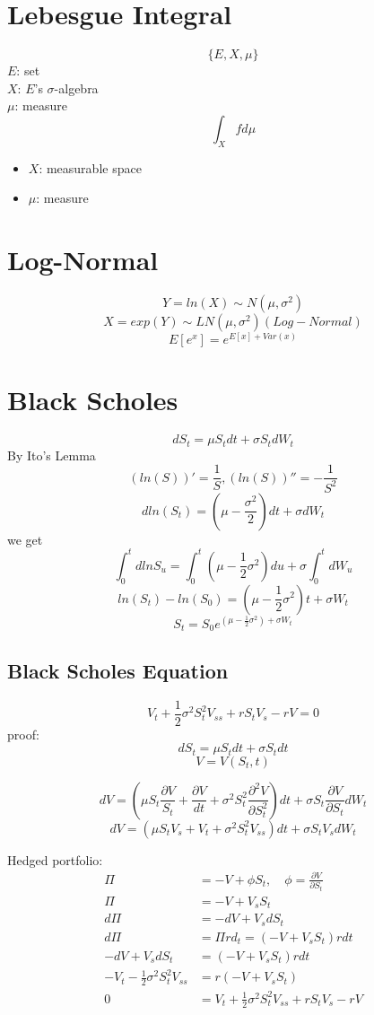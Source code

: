 \documentclass[12pt]{article}
\begin{document}
\section{Lebesgue Integral}

$$\{E,X,\mu\}$$
$E$: set\\
$X$: $E$'s $\sigma$-algebra\\
$\mu$: measure\\
$$\int_X f d\mu$$
\begin{itemize}
    \item $X$: measurable space
    \item $\mu$: measure
\end{itemize}



\section{Log-Normal}
$$Y=ln(X) \sim N(\mu,\sigma^2)$$
$$X=exp(Y) \sim LN(\mu,\sigma^2)(Log-Normal)$$
$$E[e^x]=e^{E[x]+Var(x)}$$


\section{Black Scholes}
$$dS_t=\mu S_t dt + \sigma S_t dW_t$$
By Ito's Lemma
$$(ln(S))'=\frac{1}{S}, (ln(S))''=-\frac{1}{S^2}$$
$$dln(S_t)=(\mu-\frac{\sigma^2}{2})dt + \sigma dW_t$$
we get
$$\int_0^t dlnS_u = \int_0^t (\mu-\frac{1}{2}\sigma^2)du + \sigma\int_0^tdW_u$$
$$ln(S_t)-ln(S_0)=(\mu-\frac{1}{2}\sigma^2)t + \sigma W_t$$
$$S_t=S_0 e^{(\mu - \frac{1}{2}\sigma^2)+\sigma W_t}$$

\subsection{Black Scholes Equation}
$$V_t + \frac{1}{2}\sigma^2 S_t^2 V_{ss} +rS_t V_s - rV=0$$
proof:
$$dS_t=\mu S_t dt + \sigma S_t dt$$
$$V = V(S_t, t)$$

$$dV = (\mu S_t \frac{\partial V}{S_t} + \frac{\partial V}{dt} + \sigma^2 S_t^2 \frac{\partial^2 V}{\partial S_t^2})dt + \sigma S_t \frac{\partial V}{\partial S_t} dW_t$$
$$dV = (\mu S_t V_s + V_t + \sigma^2 S_t^2 V_{ss})dt + \sigma S_t V_s dW_t$$

Hedged portfolio:
\begin{align*} 
\Pi &= -V + \phi S_t,\quad \phi=\frac{\partial V}{\partial S_t}
\\
\Pi &= -V + V_s S_t
\\
d\Pi &= -dV + V_s dS_t
\\
d\Pi &= \Pi r d_t = (-V + V_s S_t)rdt
\\
-dV + V_s dS_t &= (-V + V_s S_t)rdt
\\
-V_t - \frac{1}{2}\sigma^2 S_t^2 V_{ss} &= r(-V + V_s S_t)
\\
0 &= V_t + \frac{1}{2}\sigma^2 S_t^2 V_{ss} +rS_t V_s - rV
\\
\end{align*} 
\end{document}
